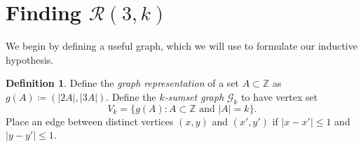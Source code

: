 \documentclass{daj}
\theoremstyle{definition}
\newtheorem{definition}[theorem]{Definition}
\theoremstyle{remark}
\numberwithin{equation}{section}
\numberwithin{theorem}{section}
\newcommand{\Z}{\mathbb{Z}}
\newcommand{\calr}{\mathcal{R}}
\begin{document}
\section{Finding \texorpdfstring{$\calr(3,k)$}{R(3,k)}}\label{secth3}

We begin by defining a useful graph, which we will use to formulate our inductive hypothesis.

\begin{definition}
    Define the \emph{graph representation} of a set $A \subset \Z$ as $g(A)\coloneq  (|2A|,|3A|)$.
    Define the \emph{$k$-sumset graph} $\mathcal{G}_k$ to have vertex set \[ V_k = \{g(A): A \subset \Z \text{ and } |A| = k\}.\] Place an edge between distinct vertices $(x,y)$ and $(x',y')$ if $|x-x'| \leq 1$ and $|y-y'| \leq 1$.
\end{definition}
\end{document}
